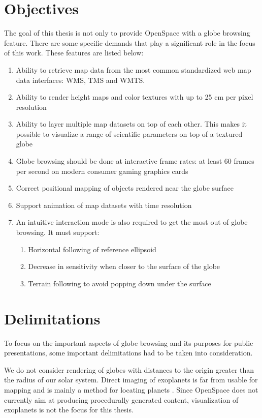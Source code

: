 \section{Objectives}

The goal of this thesis is not only to provide OpenSpace with a globe browsing feature. There are some specific demands that play a significant role in the focus of this work. These features are listed below:

\begin{enumerate}
    \item Ability to retrieve map data from the most common standardized web map data interfaces: WMS, TMS and WMTS.
    \item Ability to render height maps and color textures with up to 25 cm per pixel resolution
    \item Ability to layer multiple map datasets on top of each other. This makes it possible to visualize a range of scientific parameters on top of a textured globe
    \item Globe browsing should be done at interactive frame rates: at least 60 frames per second on modern consumer gaming graphics cards
    \item Correct positional mapping of objects rendered near the globe surface
    \item Support animation of map datasets with time resolution
    \item An intuitive interaction mode is also required to get the most out of globe browsing. It must support:
	\begin{enumerate}
    		\item Horizontal following of reference ellipsoid
		\item Decrease in sensitivity when closer to the surface of the globe
		\item Terrain following to avoid popping down under the surface
	\end{enumerate}
\end{enumerate}

\section{Delimitations}

To focus on the important aspects of globe browsing and its purposes for public presentations, some important delimitations had to be taken into consideration.

We do not consider rendering of globes with distances to the origin greater than the radius of our solar system. Direct imaging of exoplanets is far from usable for mapping and is mainly a method for locating planets \cite{exoplanets}. Since OpenSpace does not currently aim at producing procedurally generated content, visualization of exoplanets is not the focus for this thesis.

